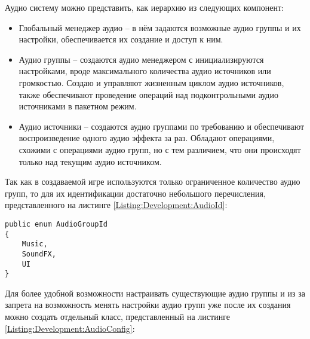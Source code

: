 Аудио систему можно представить, как иерархию из следующих компонент:
\begin{itemize}
  \item Глобальный менеджер аудио -- в нём задаются возможные аудио группы и их настройки, обеспечивается их создание и доступ к ним.
  \item Аудио группы -- создаются аудио менеджером с инициализируются настройками, вроде максимального количества аудио источников или громкостью. Создаю и управляют жизненным циклом аудио источников, также обеспечивают проведение операций над подконтрольными аудио источниками в пакетном режим.
  \item Аудио источники -- создаются аудио группами по требованию и обеспечивают воспроизведение одного аудио эффекта за раз. Обладают операциями, схожими с операциями аудио групп, но с тем различием, что они происходят только над текущим аудио источником.
\end{itemize}

Так как в создаваемой игре используются только ограниченное количество аудио групп, то для их идентификации достаточно небольшого перечисления, представленного на листинге \ref{Listing:Development:AudioId}:

\begin{lstlisting}[caption={Перечесление с типами аудио групп}, label=Listing:Development:AudioId]
public enum AudioGroupId
{
    Music,
    SoundFX,
    UI
}
\end{lstlisting}

Для более удобной возможности настраивать существующие аудио группы и из за запрета на возможность менять настройки аудио групп уже после их создания можно создать отдельный класс, представленный на листинге \ref{Listing:Development:AudioConfig}:

